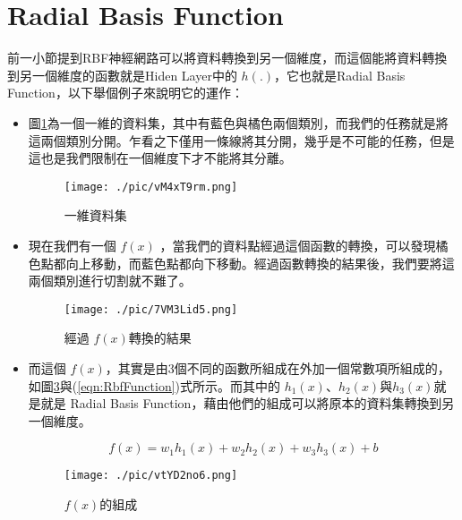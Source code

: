 \section{Radial Basis Function}
前一小節提到RBF神經網路可以將資料轉換到另一個維度，而這個能將資料轉換到另一個維度的函數就是Hiden Layer中的 \(h(.)\)，它也就是Radial Basis Function，以下舉個例子來說明它的運作：

\begin{itemize}
	\item

	      圖\ref{fig:RbfIntroductionNotTransfer}為一個一維的資料集，其中有藍色與橘色兩個類別，而我們的任務就是將這兩個類別分開。乍看之下僅用一條線將其分開，幾乎是不可能的任務，但是這也是我們限制在一個維度下才不能將其分離。



	      \begin{figure}[h]
		      \centering
		      \texttt{[image: ./pic/vM4xT9rm.png]}
		      \caption{一維資料集}
		      \label{fig:RbfIntroductionNotTransfer}
	      \end{figure}

	\item
	      現在我們有一個 \(f(x)\) ，當我們的資料點經過這個函數的轉換，可以發現橘色點都向上移動，而藍色點都向下移動。經過函數轉換的結果後，我們要將這兩個類別進行切割就不難了。

	      \begin{figure}[h]
		      \centering
		      \texttt{[image: ./pic/7VM3Lid5.png]}
		      \caption{經過 \(f(x)\)轉換的結果 }
		      \label{fig:RbfWithFunction}
	      \end{figure}


	\item
	      而這個 \(f(x)\)，其實是由3個不同的函數所組成在外加一個常數項所組成的，如圖\ref{fig:RbfFunctionAssemble}與(\ref{eqn:RbfFunction})式所示。而其中的 \(h_1(x)\)、\(h_2(x)\)與\(h_3(x)\)就是就是 Radial Basis Function，藉由他們的組成可以將原本的資料集轉換到另一個維度。

	      \begin{equation}
		      \label{eqn:RbfFunction}
		      f(x)=w_1h_1(x)+w_2h_2(x)+w_3h_3(x)+b
	      \end{equation}

	      \begin{figure}[h]
		      \centering
		      \texttt{[image: ./pic/vtYD2no6.png]}
		      \caption{\(f(x)\)的組成 }
		      \label{fig:RbfFunctionAssemble}
	      \end{figure}


\end{itemize}

